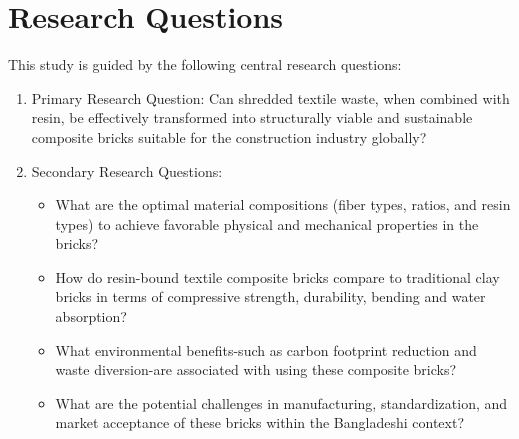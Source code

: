 \section{Research Questions}
This study is guided by the following central research questions:

\begin{enumerate}

\item Primary Research Question: 
Can shredded textile waste, when combined with resin, be effectively transformed into structurally viable and sustainable composite bricks suitable for the construction industry globally? 

\item Secondary Research Questions: 
\begin{itemize}
    \item What are the optimal material compositions (fiber types, ratios, and resin types) to achieve favorable physical and mechanical properties in the bricks?

    \item How do resin-bound textile composite bricks compare to traditional clay bricks in terms of compressive strength, durability, bending and water absorption?

    \item What environmental benefits-such as carbon footprint reduction and waste diversion-are associated with using these composite bricks?

    \item What are the potential challenges in manufacturing, standardization, and market acceptance of these bricks within the Bangladeshi context?
\end{itemize}

\end{enumerate}